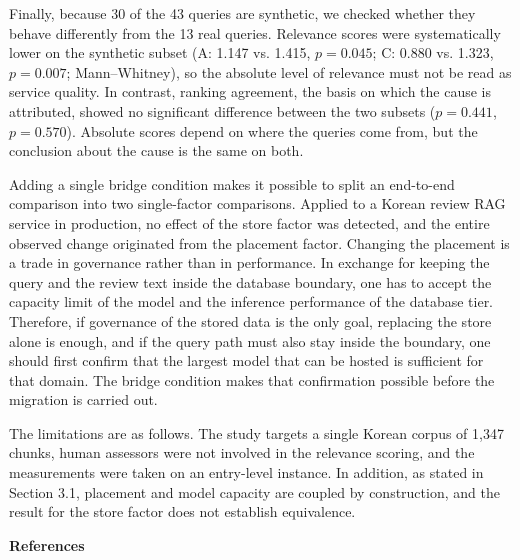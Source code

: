 \documentclass[10pt,a4paper,twocolumn]{article}
\newcommand{\pgsec}[1]{\par\vspace{5pt}{\bfseries\fontsize{12}{14}\selectfont #1}\par\nobreak\vspace{2pt}\nobreak}
\newcommand{\pgspecial}[1]{\par\vspace{5pt}\begin{center}{\bfseries\fontsize{12}{14}\selectfont #1}\end{center}\vspace{2pt}}
\begin{document}
Finally, because 30 of the 43 queries are synthetic, we checked whether they behave differently from the 13 real queries. Relevance scores were systematically lower on the synthetic subset (A: 1.147 vs. 1.415, $p = 0.045$; C: 0.880 vs. 1.323, $p = 0.007$; Mann--Whitney), so the absolute level of relevance must not be read as service quality. In contrast, ranking agreement, the basis on which the cause is attributed, showed no significant difference between the two subsets ($p = 0.441$, $p = 0.570$). Absolute scores depend on where the queries come from, but the conclusion about the cause is the same on both.

\pgsec{4. Conclusion}

Adding a single bridge condition makes it possible to split an end-to-end comparison into two single-factor comparisons. Applied to a Korean review RAG service in production, no effect of the store factor was detected, and the entire observed change originated from the placement factor. Changing the placement is a trade in governance rather than in performance. In exchange for keeping the query and the review text inside the database boundary, one has to accept the capacity limit of the model and the inference performance of the database tier. Therefore, if governance of the stored data is the only goal, replacing the store alone is enough, and if the query path must also stay inside the boundary, one should first confirm that the largest model that can be hosted is sufficient for that domain. The bridge condition makes that confirmation possible before the migration is carried out.

The limitations are as follows. The study targets a single Korean corpus of 1,347 chunks, human assessors were not involved in the relevance scoring, and the measurements were taken on an entry-level instance. In addition, as stated in Section 3.1, placement and model capacity are coupled by construction, and the result for the store factor does not establish equivalence.

\pgspecial{References}
\end{document}

